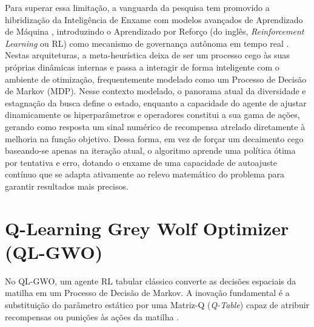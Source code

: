 \documentclass[12pt, a4paper, oneside]{report}
\begin{document}
Para superar essa limitação, a vanguarda da pesquisa tem promovido a hibridização da Inteligência de Enxame com modelos avançados de Aprendizado de Máquina \cite{jamali2025systematic}, introduzindo o Aprendizado por Reforço (do inglês, \textit{Reinforcement Learning} ou RL) como mecanismo de governança autônoma em tempo real \cite{tu2024qlearning, nayeem2025adaptive}. Nestas arquiteturas, a meta-heurística deixa de ser um processo cego às suas próprias dinâmicas internas e passa a interagir de forma inteligente com o ambiente de otimização, frequentemente modelado como um Processo de Decisão de Markov (MDP). Nesse contexto modelado, o panorama atual da diversidade e estagnação da busca define o estado, enquanto a capacidade do agente de ajustar dinamicamente os hiperparâmetros e operadores constitui a sua gama de ações, gerando como resposta um sinal numérico de recompensa atrelado diretamente à melhoria na função objetivo. Dessa forma, em vez de forçar um decaimento cego baseando-se apenas na iteração atual, o algoritmo aprende uma política ótima por tentativa e erro, dotando o enxame de uma capacidade de autoajuste contínuo que se adapta ativamente ao relevo matemático do problema para garantir resultados mais precisos.


\section{Q-Learning Grey Wolf Optimizer (QL-GWO)}
No QL-GWO, um agente RL tabular clássico converte as decisões espaciais da matilha em um Processo de Decisão de Markov. A inovação fundamental é a substituição do parâmetro estático por uma Matriz-Q (\textit{Q-Table}) capaz de atribuir recompensas ou punições às ações da matilha \citep{nayeem2025adaptive, tu2024qlearning}.
\end{document}
